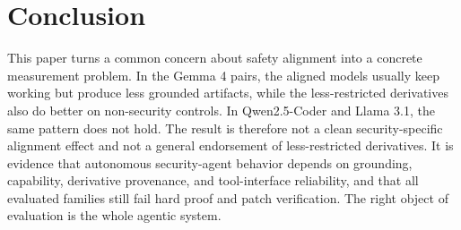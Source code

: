 \section{Conclusion}

This paper turns a common concern about safety alignment into a concrete
measurement problem. In the Gemma 4 pairs, the aligned models usually keep
working but produce less grounded artifacts, while the less-restricted
derivatives also do better on non-security controls. In Qwen2.5-Coder and
Llama 3.1, the same pattern does not hold. The result is therefore not a clean
security-specific alignment effect and not a general endorsement of
less-restricted derivatives. It is evidence that autonomous security-agent
behavior depends on grounding, capability, derivative provenance, and
tool-interface reliability, and that all evaluated families still fail hard
proof and patch verification. The right object of evaluation is the whole
agentic system.
